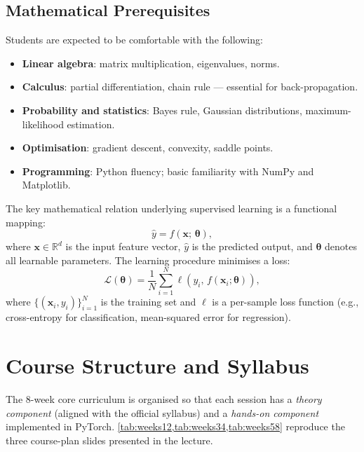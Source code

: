 \documentclass[12pt,a4paper]{article}
\begin{document}
\subsection{Mathematical Prerequisites}
\label{subsec:mathprereq}

Students are expected to be comfortable with the following:

\begin{itemize}
  \item \textbf{Linear algebra}: matrix multiplication, eigenvalues, norms.
  \item \textbf{Calculus}: partial differentiation, chain rule — essential for
        back-propagation.
  \item \textbf{Probability and statistics}: Bayes rule, Gaussian distributions,
        maximum-likelihood estimation.
  \item \textbf{Optimisation}: gradient descent, convexity, saddle points.
  \item \textbf{Programming}: Python fluency; basic familiarity with NumPy and
        Matplotlib.
\end{itemize}

The key mathematical relation underlying supervised learning is a functional
mapping:
\begin{equation}
  \label{eq:functional_mapping}
  \hat{y} = f(\mathbf{x};\,\boldsymbol{\theta}),
\end{equation}
where $\mathbf{x} \in \mathbb{R}^d$ is the input feature vector, $\hat{y}$ is
the predicted output, and $\boldsymbol{\theta}$ denotes all learnable
parameters.  The learning procedure minimises a loss:
\begin{equation}
  \label{eq:loss}
  \mathcal{L}(\boldsymbol{\theta})
  = \frac{1}{N}\sum_{i=1}^{N} \ell\!\left(y_i,\, f(\mathbf{x}_i;\boldsymbol{\theta})\right),
\end{equation}
where $\{(\mathbf{x}_i, y_i)\}_{i=1}^{N}$ is the training set and $\ell$ is a
per-sample loss function (e.g., cross-entropy for classification, mean-squared
error for regression).

\section{Course Structure and Syllabus}
\label{sec:courseplan}

The 8-week core curriculum is organised so that each session has a \emph{theory
component} (aligned with the official syllabus) and a \emph{hands-on component}
implemented in PyTorch.  \cref{tab:weeks12,tab:weeks34,tab:weeks58} reproduce
the three course-plan slides presented in the lecture.
\end{document}
